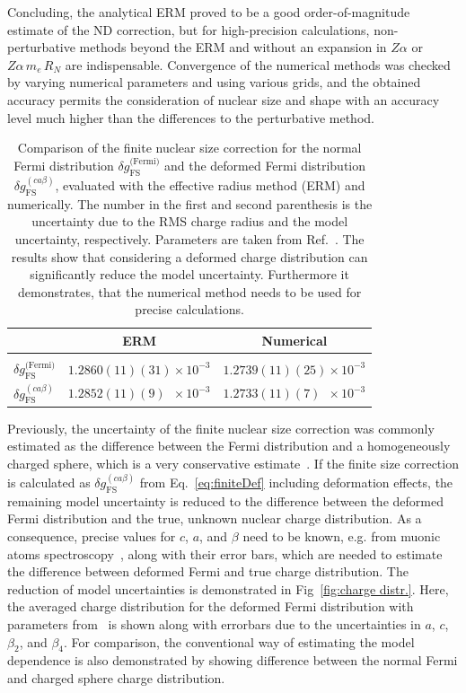 Concluding, the analytical ERM proved to be a good order-of-magnitude estimate of the ND correction, but for high-precision calculations, non-perturbative methods beyond the ERM and without an expansion in $Z\alpha$ or $Z\alpha\, m_e\, R_N$ are indispensable. Convergence of the numerical methods was checked by varying numerical parameters and using various grids, and the obtained accuracy permits the consideration of nuclear size and shape with an accuracy level much higher than the differences to the perturbative method.

\begin{table}[h]
\caption{\label{tab:uranium}%
Comparison of the finite nuclear size correction for the normal Fermi distribution $\delta g_{\text{FS}}^{\text{(Fermi)}}$ and the deformed Fermi distribution $\delta g^{(ca\beta)}_{\text{FS}}$, evaluated with the effective radius method (ERM) and numerically. The number in the first and second parenthesis is the uncertainty due to the RMS charge radius and the model uncertainty, respectively. Parameters are taken from Ref.~\cite{kozhedub2008}. The results show that considering a deformed charge distribution can significantly reduce the model uncertainty. Furthermore it demonstrates, that the numerical method needs to be used for precise calculations.
}
\centering
\begin{tabular}{l|cc}
&ERM&Numerical\\\hline\\
$\delta g_{\text{FS}}^{\text{(Fermi)}}$&$1.2860(11)(31)\times 10^{-3}$&$1.2739(11)(25)\times 10^{-3}$\\[0.4cm]
$\delta g^{(ca\beta)}_{\text{FS}}$&$1.2852(11)(9)\phantom{0}\times 10^{-3}$&$1.2733(11)(7)\phantom{0}\times 10^{-3}$
\end{tabular}
\end{table}
Previously, the uncertainty of the finite nuclear size correction was commonly estimated as the difference between the Fermi distribution and a homogeneously charged sphere, which is a very conservative estimate~\cite{Shabaev2006}. If the finite size correction is calculated as $\delta g^{(ca\beta)}_{\text{FS}}$ from Eq.~\eqref{eq:finiteDef} including deformation effects, the remaining model uncertainty is reduced to the difference between the deformed Fermi distribution and the true, unknown nuclear charge distribution.
As a consequence, precise values for $c$, $a$, and $\beta$ need to be known, e.g. from muonic atoms spectroscopy~\cite{Close1978,hitlin1970}, along with their error bars, which are needed to estimate the difference between deformed Fermi and true charge distribution. 
The reduction of model uncertainties is demonstrated in Fig~\ref{fig:charge distr.}. Here, the averaged charge distribution for the deformed Fermi distribution with parameters from~\cite{kozhedub2008} is shown along with errorbars due to the uncertainties in $a$, $c$, $\beta_2$, and $\beta_4$. For comparison, the conventional way of estimating the model dependence is also demonstrated by showing difference between the normal Fermi and charged sphere charge distribution.

